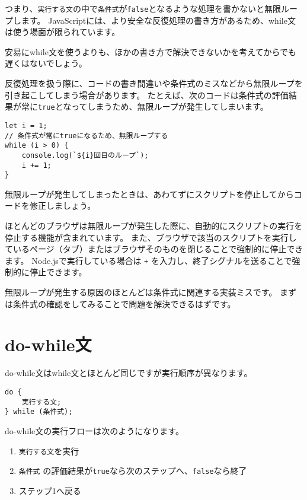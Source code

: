 つまり、\texttt{実行する文}の中で\texttt{条件式}が\texttt{false}となるような処理を書かないと無限ループします。
JavaScriptには、より安全な反復処理の書き方があるため、while文は使う場面が限られています。

安易にwhile文を使うよりも、ほかの書き方で解決できないかを考えてからでも遅くはないでしょう。

\begin{tcolorbox}[title=無限ループ]\label{inifinite-loop}

反復処理を扱う際に、コードの書き間違いや条件式のミスなどから無限ループを引き起こしてしまう場合があります。
たとえば、次のコードは条件式の評価結果が常に\texttt{true}となってしまうため、無限ループが発生してしまいます。

\begin{lstlisting}
let i = 1;
// 条件式が常にtrueになるため、無限ループする
while (i > 0) {
    console.log(`${i}回目のループ`);
    i += 1;
}
\end{lstlisting}

無限ループが発生してしまったときは、あわてずにスクリプトを停止してからコードを修正しましょう。

ほとんどのブラウザは無限ループが発生した際に、自動的にスクリプトの実行を停止する機能が含まれています。
また、ブラウザで該当のスクリプトを実行しているページ（タブ）またはブラウザそのものを閉じることで強制的に停止できます。
Node.jsで実行している場合は \texttt{+} を入力し、終了シグナルを送ることで強制的に停止できます。

無限ループが発生する原因のほとんどは条件式に関連する実装ミスです。
まずは条件式の確認をしてみることで問題を解決できるはずです。
\end{tcolorbox}

\hypertarget{do-while-statement}{%
\section{do-while文}\label{do-while-statement}}

do-while文はwhile文とほとんど同じですが実行順序が異なります。

\begin{lstlisting}
do {
    実行する文;
} while (条件式);
\end{lstlisting}

do-while文の実行フローは次のようになります。

\begin{enumerate}
\def\labelenumi{\arabic{enumi}.}
\item
  \texttt{実行する文}を実行
\item
  \texttt{条件式}
  の評価結果が\texttt{true}なら次のステップへ、\texttt{false}なら終了
\item
  ステップ1へ戻る
\end{enumerate}

